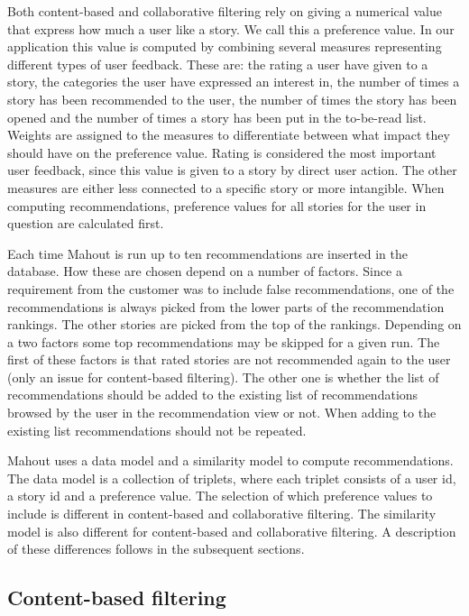 Both content-based and collaborative filtering rely on giving a numerical value that express how much a user like a story. We call this a preference value. In our application this value is computed by combining several measures representing different types of user feedback. These are: the rating a user have given to a story, the categories the user have expressed an interest in, the number of times a story has been recommended to the user, the number of times the story has been opened and the number of times a story has been put in the to-be-read list. Weights are assigned to the measures to differentiate between what impact they should have on the preference value. Rating is considered the most important user feedback, since this value is given to a story by direct user action. The other measures are either less connected to a specific story or more intangible. When computing recommendations, preference values for all stories for the user in question are calculated first.\newline

Each time Mahout is run up to ten recommendations are inserted in the database. How these are chosen depend on a number of factors. Since a requirement from the customer was to include false recommendations, one of the recommendations is always picked from the lower parts of the recommendation rankings. The other stories are picked from the top of the rankings. Depending on a two factors some top recommendations may be skipped for a given run. The first of these factors is that rated stories are not recommended again to the user (only an issue for content-based filtering). The other one is whether the list of recommendations should be added to the existing list of recommendations browsed by the user in the recommendation view or not. When adding to the existing list recommendations should not be repeated.\newline

Mahout uses a data model and a similarity model to compute recommendations. The data model is a collection of triplets, where each triplet consists of a user id, a story id and a preference value. The selection of which preference values to include is different in content-based and collaborative filtering. The similarity model is also different for content-based and collaborative filtering. A description of these differences follows in the subsequent sections.    

\subsection{Content-based filtering}

